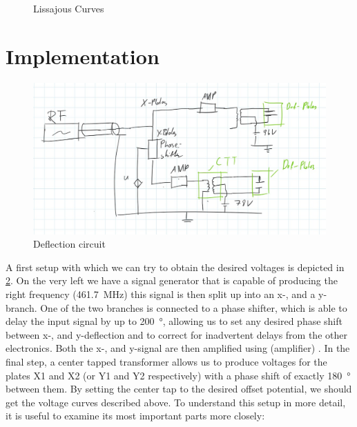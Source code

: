 \begin{figure}[ht]
	\centering
	
	\begin{tikzpicture}
		
	\end{tikzpicture}
	
	\caption{Lissajous Curves}
	\label{fig:Lissajous Curves}
\end{figure}

\section{Implementation}

\begin{figure}[ht]
	\centering
	\includegraphics[width=0.7\linewidth]{Chapters/Deflection/deflec_circuit}
	\caption{Deflection circuit}
	\label{fig:deflec_circuit}
\end{figure}

A first setup with which we can try to obtain the desired voltages is depicted in \cref{fig:deflec_circuit}. On the  very left we have a signal generator that is capable of producing the right frequency (\SI{461.7}{\mega\hertz}) this signal is then split up into an x-, and a y-branch. One of the two branches is connected to a phase shifter, which is able to delay the input signal by up to \SI{200}{\degree}, allowing us to set any desired phase shift between x-, and y-deflection and to correct for inadvertent delays from the other electronics. Both the x-, and  y-signal are then amplified using (amplifier) . In the final step, a center tapped transformer allows us to produce voltages for the plates X1 and X2 (or Y1 and Y2 respectively) with a phase shift of exactly \SI{180}{\degree} between them. By setting the center tap to the desired offset potential, we should get the voltage curves described above. To understand this setup in more detail, it is useful to examine its most important parts more closely:

